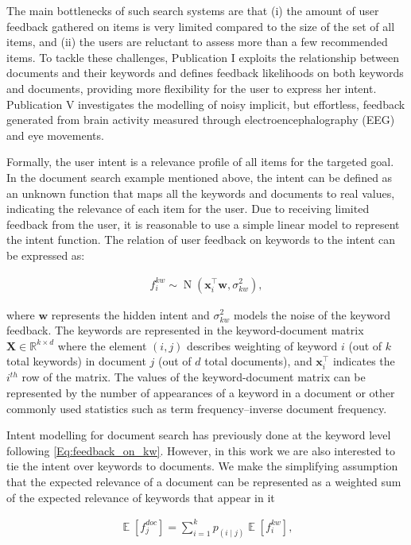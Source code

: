 \documentclass[dissertation,math,vertlayout,pdfa,colorlinks]{aaltoseries}
\newcommand{\bw}{\bm{w}}
\DeclareMathOperator{\normalpdf}{N}
\DeclareMathOperator{\E}{\mathbb{E}}
\newcommand{\tp}{^{\top}}
\begin{document}
The main bottlenecks of such search systems are that (i) the amount of user feedback gathered on items is very limited compared to the size of the set of all items, and (ii) the users are reluctant to assess more than a few recommended items. To tackle these challenges, Publication I exploits the relationship between documents and their keywords and defines feedback likelihoods on both keywords and documents, providing more flexibility for the user to express her intent. Publication V investigates the modelling of noisy implicit, but effortless, feedback generated from brain activity measured through electroencephalography (EEG) and eye movements.  

Formally, the user intent is a relevance profile of all items for the targeted goal. In the document search example mentioned above, the intent can be defined as an unknown function that maps all the keywords %
and documents to real values, indicating the relevance of each item for the user. Due to receiving limited feedback from the user, it is reasonable to use a simple linear model to represent the intent function. The relation of user feedback on keywords to the intent can be expressed as:

\begin{align}\label{Eq:feedback_on_kw} 
f_{i}^{kw} \sim \normalpdf(\bm{x}_i\tp \bw, \sigma_{kw}^2), 
\end{align}

\noindent where $\bw$ represents the hidden intent and $\sigma_{kw}^2$ models the noise of the keyword feedback. The keywords are represented in the keyword-document matrix $\bm{X} \in \mathbb{R}^{k \times d}$ where the element $(i,j)$ describes weighting of keyword $i$ (out of $k$ total keywords) in document $j$ (out of $d$ total documents), and $\bm{x}_i\tp$ indicates the $i^{th}$ row of the matrix. The values of the keyword-document matrix can be represented by the number of appearances of a keyword in a document or other commonly used statistics such as term frequency–inverse document frequency. 

Intent modelling for document search has previously done at the keyword level \cite{Ruotsalo2018} following \ref{Eq:feedback_on_kw}. However, in this work we are also interested to tie the intent over keywords to documents. We make the simplifying assumption that the expected relevance of a document can be represented as a weighted sum of the expected relevance of keywords that appear in it

\begin{align}\label{Eq:doc_key_relation} 
 \E[f_{j}^{doc}] = \sum_{i=1}^{k} p_{(i \mid j)}  \E[f_{i}^{kw}],
\end{align}
\end{document}
